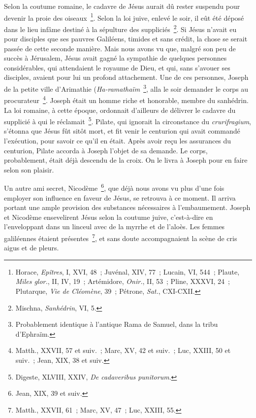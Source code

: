 \documentclass[french,twoside]{book} %
\begin{document}
Selon la coutume romaine, le cadavre de Jésus aurait dû rester suspendu pour devenir la proie des oiseaux \footnote{ Horace, {\itshape Epîtres}, I, XVI, 48 ; Juvénal, XIV, 77 ; Lucain, VI, 544 ; Plaute, {\itshape Miles glor.}, II, IV, 19 ; Artémidore, {\itshape Onir.}, II, 53 ; Pline, XXXVI, 24 ; Plutarque, {\itshape Vie de Cléomène}, 39 ; Pétrone, {\itshape Sat.}, CXI-CXII.}. Selon la loi juive, enlevé le soir, il eût été déposé dans le lieu infâme destiné à la sépulture des suppliciés \footnote{ Mischna, {\itshape Sanhédrin}, VI, 5.}. Si Jésus n’avait eu pour disciples que ses pauvres Galiléens, timides et sans crédit, la chose se serait passée de cette seconde manière. Mais nous avons vu que, malgré son peu de succès à Jérusalem, Jésus avait gagné la sympathie de quelques personnes considérables, qui attendaient le royaume de Dieu, et qui, sans s’avouer ses disciples, avaient pour lui un profond attachement. Une de ces personnes, Joseph de la petite ville d’Arimathie ({\itshape Ha-ramathaïm} \footnote{Probablement identique à l’antique Rama de Samuel, dans la tribu d’Ephraïm.}, alla le soir demander le corps au procurateur \footnote{Matth., XXVII, 57 et suiv. ; Marc, XV, 42 et suiv. ; Luc, XXIII, 50 et suiv. ; Jean, XIX, 38 et suiv.}. Joseph était un homme riche et honorable, membre du sanhédrin. La loi romaine, à cette époque, ordonnait d’ailleurs de délivrer le cadavre du supplicié à qui le réclamait \footnote{ Digeste, XLVIII, XXIV, {\itshape De cadaveribus punitorum}.}. Pilate, qui ignorait la circonstance du {\itshape crurifragium}, s’étonna que Jésus fût sitôt mort, et fit venir le centurion qui avait commandé l’exécution, pour savoir ce qu’il en était. Après avoir reçu les assurances du centurion, Pilate accorda à Joseph l’objet de sa demande. Le corps, probablement, était déjà descendu de la croix. On le livra à Joseph pour en faire selon son plaisir.\par
Un autre ami secret, Nicodème \footnote{Jean, XIX, 39 et suiv.}, que déjà nous avons vu plus d’une fois employer son influence en faveur de Jésus, se retrouva à ce moment. Il arriva portant une ample provision des substances nécessaires à l’embaumement. Joseph et Nicodème ensevelirent Jésus selon la coutume juive, c’est-à-dire en l’enveloppant dans un linceul avec de la myrrhe et de l’aloès. Les femmes galiléennes étaient présentes \footnote{Matth., XXVII, 61 ; Marc, XV, 47 ; Luc, XXIII, 55.}, et sans doute accompagnaient la scène de cris aigus et de pleurs.\par
\end{document}

